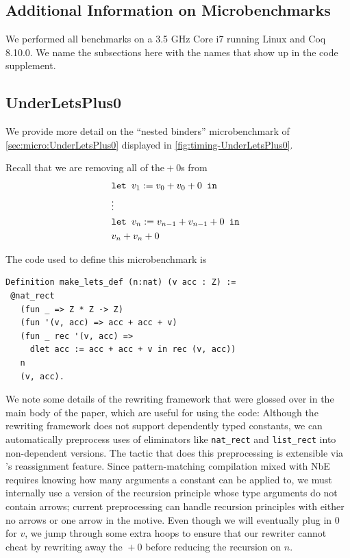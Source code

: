 \clearpage
\begin{subappendices}
\section{Additional Information on Microbenchmarks} \label{sec:additionalMicro}

We performed all benchmarks on a 3.5 GHz Core i7 running Linux and Coq 8.10.0.
We name the subsections here with the names that show up in the code supplement.

\subsection{UnderLetsPlus0} \label{sec:UnderLetsPlus0-more}

We provide more detail on the ``nested binders'' microbenchmark of \autoref{sec:micro:UnderLetsPlus0} displayed in \autoref{fig:timing-UnderLetsPlus0}.

Recall that we are removing all of the${}+0$s from
{\small \begin{align*}
  & \letin[{v_1 := v_0 + v_0 + 0}{}] \\
  & \vdots \\
  & \letin[{v_n := v_{n-1} + v_{n-1} + 0}{}] \\
  & v_n + v_n + 0
\end{align*}}%

The code used to define this microbenchmark is
\begin{verbatim}
Definition make_lets_def (n:nat) (v acc : Z) :=
 @nat_rect
   (fun _ => Z * Z -> Z)
   (fun '(v, acc) => acc + acc + v)
   (fun _ rec '(v, acc) =>
     dlet acc := acc + acc + v in rec (v, acc))
   n
   (v, acc).
\end{verbatim}
We note some details of the rewriting framework that were glossed over in the main body of the paper, which are useful for using the code:
Although the rewriting framework does not support dependently typed constants, we can automatically preprocess uses of eliminators like \texttt{nat_rect} and \texttt{list_rect} into non-dependent versions.
The tactic that does this preprocessing is extensible via \Ltac{}'s reassignment feature.
Since pattern-matching compilation mixed with NbE requires knowing how many arguments a constant can be applied to, we must internally use a version of the recursion principle whose type arguments do not contain arrows; current preprocessing can handle recursion principles with either no arrows or one arrow in the motive.
Even though we will eventually plug in 0 for $v$, we jump through some extra hoops to ensure that our rewriter cannot cheat by rewriting away the ${}+0$ before reducing the recursion on $n$.


\end{subappendices}
